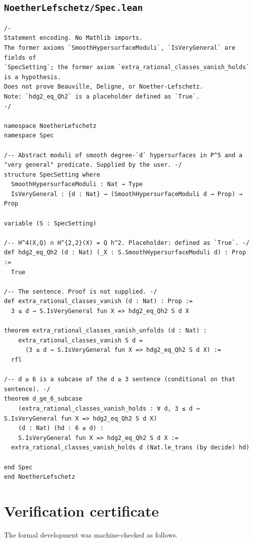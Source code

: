 \documentclass[11pt]{amsart}
\theoremstyle{definition}
\theoremstyle{remark}
\begin{document}
\subsection*{\texttt{NoetherLefschetz/Spec.lean}}
\begin{verbatim}
/-
Statement encoding. No Mathlib imports.
The former axioms `SmoothHypersurfaceModuli`, `IsVeryGeneral` are fields of
`SpecSetting`; the former axiom `extra_rational_classes_vanish_holds` is a hypothesis.
Does not prove Beauville, Deligne, or Noether-Lefschetz.
Note: `hdg2_eq_Qh2` is a placeholder defined as `True`.
-/

namespace NoetherLefschetz
namespace Spec

/-- Abstract moduli of smooth degree-`d` hypersurfaces in P^5 and a
"very general" predicate. Supplied by the user. -/
structure SpecSetting where
  SmoothHypersurfaceModuli : Nat → Type
  IsVeryGeneral : {d : Nat} → (SmoothHypersurfaceModuli d → Prop) → Prop

variable (S : SpecSetting)

/-- H^4(X,Q) ∩ H^{2,2}(X) = Q h^2. Placeholder: defined as `True`. -/
def hdg2_eq_Qh2 (d : Nat) (_X : S.SmoothHypersurfaceModuli d) : Prop :=
  True

/-- The sentence. Proof is not supplied. -/
def extra_rational_classes_vanish (d : Nat) : Prop :=
  3 ≤ d → S.IsVeryGeneral fun X => hdg2_eq_Qh2 S d X

theorem extra_rational_classes_vanish_unfolds (d : Nat) :
    extra_rational_classes_vanish S d =
      (3 ≤ d → S.IsVeryGeneral fun X => hdg2_eq_Qh2 S d X) :=
  rfl

/-- d ≥ 6 is a subcase of the d ≥ 3 sentence (conditional on that sentence). -/
theorem d_ge_6_subcase
    (extra_rational_classes_vanish_holds : ∀ d, 3 ≤ d → S.IsVeryGeneral fun X => hdg2_eq_Qh2 S d X)
    (d : Nat) (hd : 6 ≤ d) :
    S.IsVeryGeneral fun X => hdg2_eq_Qh2 S d X :=
  extra_rational_classes_vanish_holds d (Nat.le_trans (by decide) hd)

end Spec
end NoetherLefschetz
\end{verbatim}

\section{Verification certificate}\label{app:verification-certificate}

The formal development was machine-checked as follows.
\end{document}
